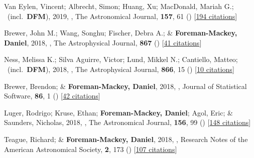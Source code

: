 \item[{\color{numcolor}\scriptsize41}] Van Eylen, Vincent; Albrecht, Simon; Huang, Xu; MacDonald, Mariah G.; \etal\ (incl.\ \textbf{DFM}), 2019, , The Astronomical Journal, \textbf{157}, 61 () [\href{https://ui.adsabs.harvard.edu/abs/2019AJ....157...61V}{194 citations}]

\item[{\color{numcolor}\scriptsize40}] Brewer, John M.; Wang, Songhu; Fischer, Debra A.; \& \textbf{Foreman-Mackey, Daniel}, 2018, , The Astrophysical Journal, \textbf{867} () [\href{https://ui.adsabs.harvard.edu/abs/2018ApJ...867L...3B}{41 citations}]

\item[{\color{numcolor}\scriptsize39}] Ness, Melissa K.; Silva Aguirre, Victor; Lund, Mikkel N.; Cantiello, Matteo; \etal\ (incl.\ \textbf{DFM}), 2018, , The Astrophysical Journal, \textbf{866}, 15 () [\href{https://ui.adsabs.harvard.edu/abs/2018ApJ...866...15N}{10 citations}]

\item[{\color{numcolor}\scriptsize38}] Brewer, Brendon; \& \textbf{Foreman-Mackey, Daniel}, 2018, , Journal of Statistical Software, \textbf{86}, 1 () [\href{https://scholar.google.com/scholar?cites=789224875040810871}{42 citations}]

\item[{\color{numcolor}\scriptsize37}] Luger, Rodrigo; Kruse, Ethan; \textbf{Foreman-Mackey, Daniel}; Agol, Eric; \& Saunders, Nicholas, 2018, , The Astronomical Journal, \textbf{156}, 99 () [\href{https://ui.adsabs.harvard.edu/abs/2018AJ....156...99L}{148 citations}]

\item[{\color{numcolor}\scriptsize36}] Teague, Richard; \& \textbf{Foreman-Mackey, Daniel}, 2018, , Research Notes of the American Astronomical Society, \textbf{2}, 173 () [\href{https://ui.adsabs.harvard.edu/abs/2018RNAAS...2..173T}{107 citations}]

